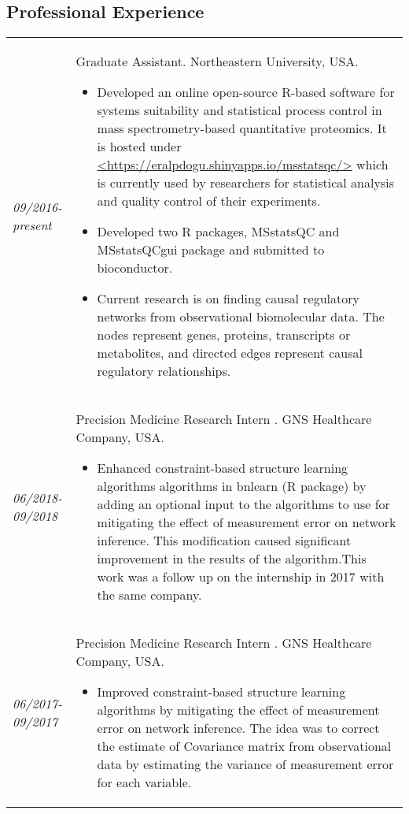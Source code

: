 \documentclass[11pt]{article}
\newcommand{\place}[1]{{\sc #1}}
\newcommand{\entry}[2]{{\emph{#1}}&{ #2 }\\[0.22cm]}
\begin{document}
\subsection*{Professional Experience}
\vspace{-0.5cm}
\begin{longtable}{@{}p{1.5cm}p{14.5cm}}

\entry{09/2016-present} {Graduate Assistant. \place{Northeastern University}, USA.
\begin{itemize}
\item Developed an online open-source R-based software for systems suitability and statistical process control in mass spectrometry-based quantitative proteomics. It is hosted under \url{<https://eralpdogu.shinyapps.io/msstatsqc/>} which is currently used by researchers for statistical analysis  and quality control of their experiments.
\item Developed two R packages, MSstatsQC and MSstatsQCgui package and submitted to bioconductor.
\item Current research is on finding causal regulatory networks from observational biomolecular data. The nodes represent genes, proteins, transcripts or metabolites, and directed edges represent causal regulatory relationships.
\end{itemize}
}

\entry{06/2018-09/2018}{Precision Medicine Research Intern
. \place{GNS Healthcare Company}, USA. 
\begin{itemize} 
\vspace{-0.25cm}
\item Enhanced constraint-based structure learning algorithms algorithms in bnlearn (R package) by adding an optional input to the algorithms to use for mitigating the effect of measurement error on network inference. This modification caused significant improvement in the results of the algorithm.This work was a follow up on the internship in 2017 with the same company.
   \end{itemize}
   \vspace{-0.25cm}
}
   

\entry{06/2017-09/2017}{Precision Medicine Research Intern
. \place{GNS Healthcare Company}, USA. 
\begin{itemize} 
\vspace{-0.25cm}
\item Improved constraint-based structure learning algorithms by mitigating the effect of measurement error on network inference. The idea was to correct the estimate of Covariance matrix from observational data by estimating the variance of measurement error for each variable. 
   \end{itemize}
   \vspace{-0.25cm}
}


\end{longtable}
\end{document}
